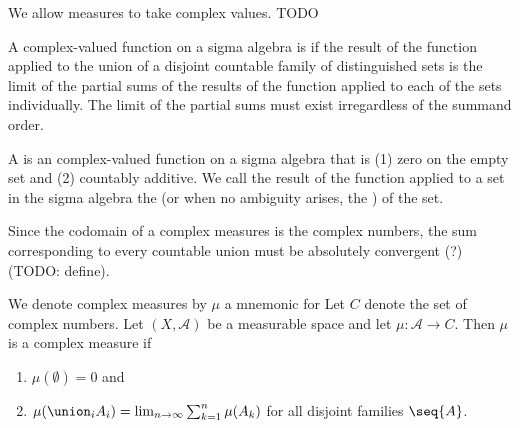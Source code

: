 
\sbasic


































\sstart
{}


We allow measures to take
complex values.
TODO


A complex-valued
function on a
sigma algebra is
if the result of the function applied to
the union of a disjoint countable family of
distinguished sets is the limit of the partial
sums of the results of the function applied
to each of the sets individually.
The limit of the partial sums must
exist irregardless of the summand order.

A
is an complex-valued
function on a
sigma algebra that is
(1) zero on the empty set and
(2) countably additive.
We call the result of the function
applied to a set in the sigma
algebra the
(or when no ambiguity arises, the
)
of the set.

Since the codomain of
a complex measures is
the complex numbers,
the sum corresponding
to every countable union
must be absolutely convergent (?)
(TODO: define).


We denote complex measures by $\mu$
a mnemonic for 
Let $C$ denote the set
of complex numbers.
Let
$(X, \mathcal{A})$
be a measurable space
and let
$\mu: \mathcal{A} \to C$.
Then $\mu$ is a complex measure if
\begin{enumerate}
  \item $\mu(\emptyset) = 0$ and
  \item
  $\mu(\union_{i} A_i) =
    \lim_{n \to \infty}
      \sum_{k = 1}^{n} \mu(A_k)$
  for all disjoint families $\seq{A}$.
\end{enumerate}
\strats
